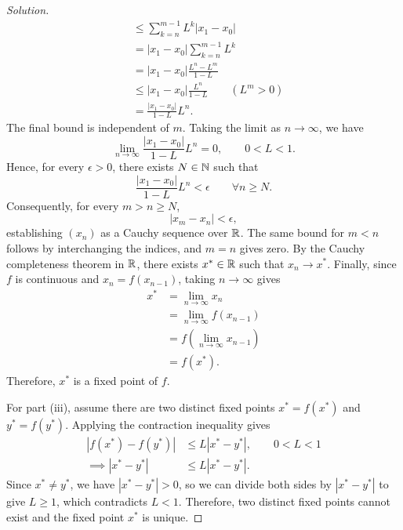 \begin{proof}[Solution]
\[\begin{aligned}
        &\le\sum_{k=n}^{m-1}L^k|x_1-x_0|\\
        &=|x_1-x_0|\sum_{k=n}^{m-1}L^k\\
        &=|x_1-x_0|\frac{L^n-L^m}{1-L}\\
        &\le |x_1-x_0|\frac{L^n}{1-L}
          \qquad(L^m>0)\\
        &=\frac{|x_1-x_0|}{1-L}L^n.
    \end{aligned}
  \]
  The final bound is independent of $m$.
  Taking the limit as $n\to\infty$, we have
  \[
    \lim_{n\to\infty}\frac{|x_1-x_0|}{1-L}L^n=0,
    \qquad 0<L<1.
  \]
  Hence, for every $\epsilon>0$, there exists $N\in\mathbb{N}$ such that
  \[
    \frac{|x_1-x_0|}{1-L}L^n<\epsilon
    \qquad\forall n\ge N.
  \]
  Consequently, for every $m>n\ge N$,
  \[
    |x_m-x_n|<\epsilon,
  \]
  establishing $(x_n)$ as a Cauchy sequence over $\mathbb{R}$.
  The same bound for $m<n$ follows by interchanging
  the indices, and $m=n$ gives zero.
  By the Cauchy completeness theorem in $\mathbb{R}$, there exists
  $x^*\in\mathbb{R}$ such that $x_n\to x^*$.
  Finally, since $f$ is continuous and $x_n=f(x_{n-1})$, taking
  $n\to\infty$ gives
  \[
    \begin{aligned}
      x^*&=\lim_{n\to\infty}x_n\\
        &=\lim_{n\to\infty}f(x_{n-1})\\
        &=f\left(\lim_{n\to\infty}x_{n-1}\right)\\
        &=f(x^*).
    \end{aligned}
  \]
  Therefore, $x^*$ is a fixed point of $f$.

  For part (iii), assume there are two distinct fixed points
  $x^*=f(x^*)$ and $y^*=f(y^*)$. Applying the contraction inequality
  gives
  \[
    \begin{aligned}
      |f(x^*)-f(y^*)|
        &\le L|x^*-y^*|,\qquad 0<L<1\\
      \implies |x^*-y^*|
        &\le L|x^*-y^*|.
    \end{aligned}
  \]
  Since $x^*\ne y^*$, we have $|x^*-y^*|>0$, so we can divide both
  sides by $|x^*-y^*|$ to give $L\ge1$, which contradicts $L<1$.
  Therefore, two distinct fixed points cannot exist and the fixed
  point $x^*$ is unique.
\end{proof}
